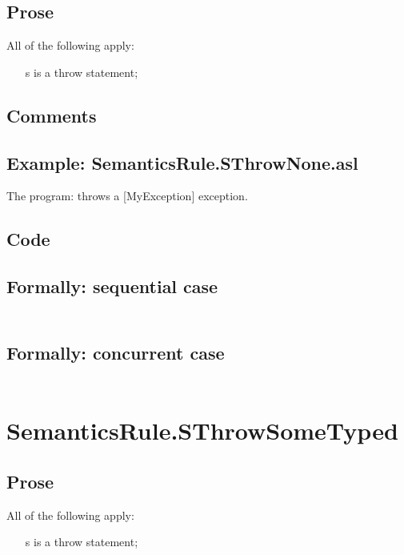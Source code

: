 \documentclass{book}
\begin{document}
    \subsection{Prose}
    All of the following apply:
    \begin{itemize}
    \item [s] is a throw statement;
    \end{itemize}

    \subsection{Comments}

    \subsection{Example: SemanticsRule.SThrowNone.asl}
    The program:
    throws a [MyException] exception.

  \subsection{Code}

  \subsection{Formally: sequential case}
  \begin{align}
  \end{align} 

  \subsection{Formally: concurrent case}
  \begin{align}
  \end{align} 

\section{SemanticsRule.SThrowSomeTyped \label{sec:SemanticsRule.SThrowSomeTyped}}

    \subsection{Prose}
    All of the following apply:
    \begin{itemize}
    \item [s] is a throw statement;
    \end{itemize}
\end{document}
